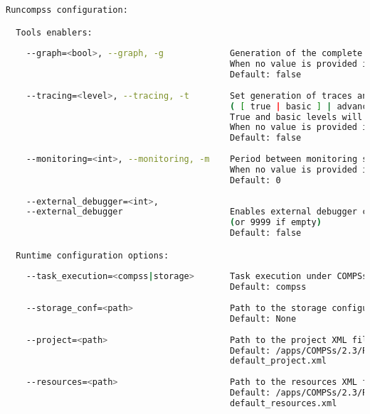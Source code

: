 \begin{lstlisting}[language=bash]
  Runcompss configuration:

  Tools enablers:
  
    --graph=<bool>, --graph, -g             Generation of the complete graph (true/false)
                                            When no value is provided it is set to true
                                            Default: false
                                            
    --tracing=<level>, --tracing, -t        Set generation of traces and/or tracing level
                                            ( [ true | basic ] | advanced | false)
                                            True and basic levels will produce the same traces.
                                            When no value is provided it is set to true
                                            Default: false
                                            
    --monitoring=<int>, --monitoring, -m    Period between monitoring samples (milliseconds)
                                            When no value is provided it is set to 2000
                                            Default: 0
                                            
    --external_debugger=<int>,
    --external_debugger                     Enables external debugger connection on the specified port
                                            (or 9999 if empty)
                                            Default: false

  Runtime configuration options:
  
    --task_execution=<compss|storage>       Task execution under COMPSs or Storage.
                                            Default: compss
                                            
    --storage_conf=<path>                   Path to the storage configuration file
                                            Default: None
                                            
    --project=<path>                        Path to the project XML file
                                            Default: /apps/COMPSs/2.3/Runtime/configuration/xml/projects/
                                            default_project.xml
                                            
    --resources=<path>                      Path to the resources XML file
                                            Default: /apps/COMPSs/2.3/Runtime/configuration/xml/resources/
                                            default_resources.xml
                                            

\end{lstlisting}
